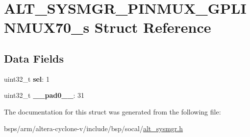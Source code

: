 \hypertarget{structALT__SYSMGR__PINMUX__GPLINMUX70__s}{}\section{A\+L\+T\+\_\+\+S\+Y\+S\+M\+G\+R\+\_\+\+P\+I\+N\+M\+U\+X\+\_\+\+G\+P\+L\+I\+N\+M\+U\+X70\+\_\+s Struct Reference}
\label{structALT__SYSMGR__PINMUX__GPLINMUX70__s}
\subsection*{Data Fields}
\begin{DoxyCompactItemize}
\item 
\mbox{\label{structALT__SYSMGR__PINMUX__GPLINMUX70__s_a174ba1568887de6f35e88342696ad714}} 
uint32\+\_\+t {\bfseries sel}\+: 1
\item 
\mbox{\label{structALT__SYSMGR__PINMUX__GPLINMUX70__s_abe942cffc452f98014195fbb966f330c}} 
uint32\+\_\+t {\bfseries \+\_\+\+\_\+pad0\+\_\+\+\_\+}\+: 31
\end{DoxyCompactItemize}


The documentation for this struct was generated from the following file\+:\begin{DoxyCompactItemize}
\item 
bsps/arm/altera-\/cyclone-\/v/include/bsp/socal/\mbox{\hyperlink{alt__sysmgr_8h}{alt\+\_\+sysmgr.\+h}}\end{DoxyCompactItemize}
